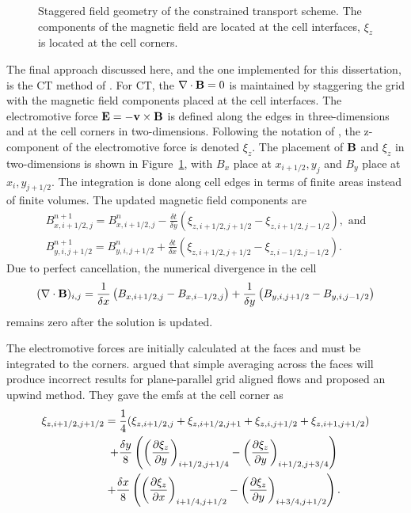 \begin{figure}[htbp]
\begin{center}

\end{center}
\caption{Staggered field geometry of the constrained transport scheme.  The components of the magnetic field are located at the cell interfaces, $\xi_z$ is located at the cell corners.}
\label{fig:ct_grid}
\end{figure}

The final approach discussed here, and the one implemented for this dissertation, is the CT method of \citet{Evans:1988}.  For CT, the $\mathbf{\nabla} \cdot \mathbf{B} = 0$ is maintained by staggering the grid with the magnetic field components placed at the cell interfaces.  The electromotive force $\mathbf{E} = -\mathbf{v} \times \mathbf{B}$ is defined along the edges in three-dimensions and at the cell corners in two-dimensions.  Following the notation of \citep{Stone:2008}, the z-component of the electromotive force is denoted $\xi_z$.  The placement of $\mathbf{B}$ and $\xi_z$ in two-dimensions is shown in Figure~\ref{fig:ct_grid}, with $B_x$ place at $x_{i+1/2}, y_j$ and $B_y$ place at $x_i,y_{j+1/2}$.  The integration is done along cell edges in terms of finite areas instead of finite volumes.  The updated magnetic field components are
\begin{gather}
B^{n+1}_{x,i+1/2,j} = B^{n}_{x,i+1/2,j} - \frac{\delta t}{\delta y}\left( \xi_{z,i+1/2,j+1/2} - \xi_{z,i+1/2,j-1/2}\right), \text{ and} \\
B^{n+1}_{y,i,j+1/2} = B^{n}_{y,i,j+1/2} + \frac{\delta t}{\delta x}\left( \xi_{z,i+1/2,j+1/2} - \xi_{z,i-1/2,j-1/2}\right).
\end{gather}
Due to perfect cancellation, the numerical divergence in the cell 
\begin{gather}
(\mathbf{\nabla} \cdot \mathbf{B})_{i,j} = \frac{1}{\delta x} \left( B_{x,i+1/2,j}  - B_{x,i-1/2,j}\right) + \frac{1}{\delta y} \left( B_{y,i,j+1/2}  - B_{y,i,j-1/2}\right) 
\end{gather}
remains zero after the solution is updated.

The electromotive forces are initially calculated at the faces and must be integrated to the corners.  \citet{Gardiner:2005} argued that simple averaging across the faces will produce incorrect results for plane-parallel grid aligned flows and proposed an upwind method.  They gave the emfs at the cell corner as 
\begin{gather}
\xi_{z,i+1/2,j+1/2} = \frac{1}{4}(\xi_{z,i+1/2,j} + \xi_{z,i+1/2,j+1} + \xi_{z,i,j+1/2} + \xi_{z,i+1,j+1/2}) \\
\;\;\;\;\;\;\;\;\;\;\;\;  +  \frac{\delta y}{8} \left( \left(\frac{\partial \xi_z}{\partial y}\right)_{i+1/2,j+1/4} - \left(\frac{\partial \xi_z}{\partial y}\right)_{i+1/2,j+3/4} \right) \\
\;\;\;\;\;\;\;\;\;\;\;\;  +  \frac{\delta x}{8} \left( \left(\frac{\partial \xi_z}{\partial x}\right)_{i+1/4,j+1/2} - \left(\frac{\partial \xi_z}{\partial y}\right)_{i+3/4,j+1/2} \right) .
\end{gather}  

